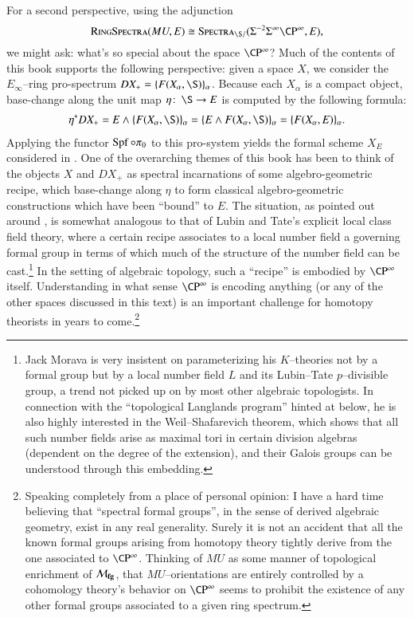 For a second perspective, using the adjunction \[\CatOf{RingSpectra}(MU, E) \cong \CatOf{Spectra}_{\S/}(\Susp^{-2} \Susp^\infty \CP^\infty, E),\] we might ask: what's so special about the space $\CP^\infty$?  Much of the contents of this book supports the following perspective: given a space $X$, we consider the $E_\infty$--ring pro-spectrum $DX_+ = \{F(X_\alpha, \S)\}_\alpha$.  Because each $X_\alpha$ is a compact object, base-change along the unit map $\eta\co \S \to E$ is computed by the following formula:
\begin{align*}
\eta^* DX_+ = E \sm \{F(X_\alpha, \S)\}_\alpha = \{E \sm F(X_\alpha, \S)\}_\alpha = \{F(X_\alpha, E)\}_\alpha.
\end{align*}
Applying the functor $\operatorname{Spf} \circ \pi_0$ to this pro-system yields the formal scheme $X_E$ considered in .  One of the overarching themes of this book has been to think of the objects $X$ and $DX_+$ as spectral incarnations of some algebro-geometric recipe, which base-change along $\eta$ to form classical algebro-geometric constructions which have been ``bound'' to $E$.  The situation, as pointed out around , is somewhat analogous to that of Lubin and Tate's explicit local class field theory, where a certain recipe associates to a local number field a governing formal group in terms of which much of the structure of the number field can be cast.\footnote{Jack Morava is very insistent on parameterizing his $K$--theories not by a formal group but by a local number field $L$ and its Lubin--Tate $p$--divisible group, a trend not picked up on by most other algebraic topologists.  In connection with the ``topological Langlands program'' hinted at below, he is also highly interested in the Weil--Shafarevich theorem\cite[Appendix III]{Weil}, which shows that all such number fields arise as maximal tori in certain division algebras (dependent on the degree of the extension), and their Galois groups can be understood through this embedding.}  In the setting of algebraic topology, such a ``recipe'' is embodied by $\CP^\infty$ itself.  Understanding in what sense $\CP^\infty$ is encoding anything (or any of the other spaces discussed in this text) is an important challenge for homotopy theorists in years to come.\footnote{Speaking completely from a place of personal opinion: I have a hard time believing that ``spectral formal groups'', in the sense of derived algebraic geometry, exist in any real generality.  Surely it is not an accident that all the known formal groups arising from homotopy theory tightly derive from the one associated to $\CP^\infty$.  Thinking of $MU$ as some manner of topological enrichment of $\mathcal{M}_{\mathbf{fg}}$, that $MU$--orientations are entirely controlled by a cohomology theory's behavior on $\CP^\infty$ seems to prohibit the existence of any other formal groups associated to a given ring spectrum.}









